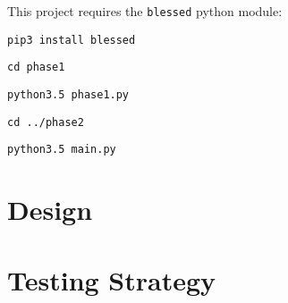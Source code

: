 \documentclass{article}
\begin{document}
This project requires the \verb|blessed| python module:

\verb|pip3 install blessed|

\verb|cd phase1|

\verb|python3.5 phase1.py|

\verb|cd ../phase2|

\verb|python3.5 main.py|

\section{Design}






\section{Testing Strategy}
\end{document}
